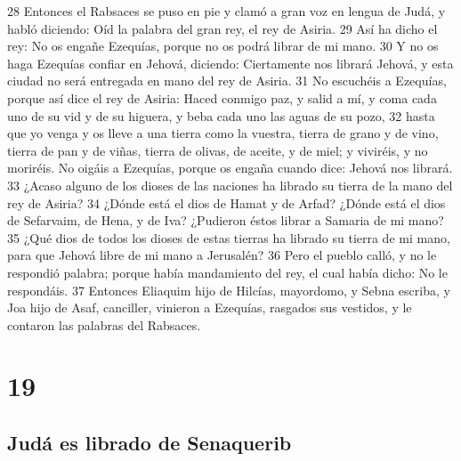 28 Entonces el Rabsaces se puso en pie y clamó a gran voz en lengua de Judá, y habló diciendo: Oíd la palabra del gran rey, el rey de Asiria.
29 Así ha dicho el rey: No os engañe Ezequías, porque no os podrá librar de mi mano.
30 Y no os haga Ezequías confiar en Jehová, diciendo: Ciertamente nos librará Jehová, y esta ciudad no será entregada en mano del rey de Asiria.
31 No escuchéis a Ezequías, porque así dice el rey de Asiria: Haced conmigo paz, y salid a mí, y coma cada uno de su vid y de su higuera, y beba cada uno las aguas de su pozo,
32 hasta que yo venga y os lleve a una tierra como la vuestra, tierra de grano y de vino, tierra de pan y de viñas, tierra de olivas, de aceite, y de miel; y viviréis, y no moriréis. No oigáis a Ezequías, porque os engaña cuando dice: Jehová nos librará.
33 ¿Acaso alguno de los dioses de las naciones ha librado su tierra de la mano del rey de Asiria?
34 ¿Dónde está el dios de Hamat y de Arfad? ¿Dónde está el dios de Sefarvaim, de Hena, y de Iva? ¿Pudieron éstos librar a Samaria de mi mano?
35 ¿Qué dios de todos los dioses de estas tierras ha librado su tierra de mi mano, para que Jehová libre de mi mano a Jerusalén?
36 Pero el pueblo calló, y no le respondió palabra; porque había mandamiento del rey, el cual había dicho: No le respondáis.
37 Entonces Eliaquim hijo de Hilcías, mayordomo, y Sebna escriba, y Joa hijo de Asaf, canciller, vinieron a Ezequías, rasgados sus vestidos, y le contaron las palabras del Rabsaces.

\chapter{19}

\section*{Judá es librado de Senaquerib }


